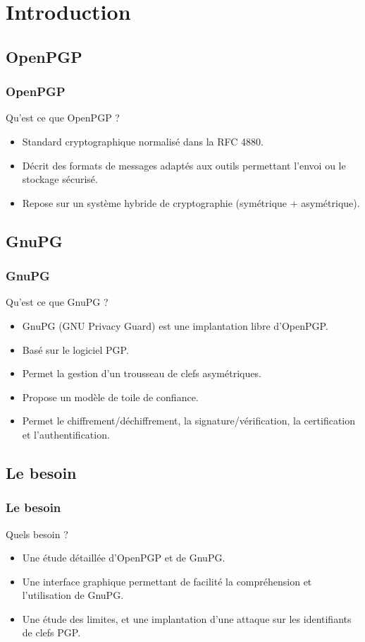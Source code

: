 \section{Introduction}
\subsection{OpenPGP}
\begin{frame}
    \frametitle{\color{white}OpenPGP}
    \begin{block}{Qu'est ce que OpenPGP ?}
    	\begin{itemize}
         \item Standard cryptographique normalisé dans la RFC 4880.
         \item Décrit des formats de messages adaptés aux outils permettant l’envoi ou le stockage sécurisé.
         \item Repose sur un système hybride de cryptographie (symétrique + asymétrique).
       \end{itemize} 
    \end{block}
\end{frame}

\subsection{GnuPG}
\begin{frame}
    \frametitle{\color{white}GnuPG}
    \begin{block}{Qu'est ce que GnuPG ?}
      \begin{itemize}
        \item GnuPG (GNU Privacy Guard) est une implantation libre d'OpenPGP.
        \item Basé sur le logiciel PGP.
        \item Permet la gestion d'un trousseau de clefs asymétriques.
        \item Propose un modèle de toile de confiance.
        \item Permet le chiffrement/déchiffrement, la signature/vérification, la certification et l'authentification.
      \end{itemize}
    \end{block}
\end{frame}

\subsection{Le besoin}
\begin{frame}
    \frametitle{\color{white}Le besoin}
    \begin{block}{Quels besoin ?}
    	\begin{itemize}
         \item Une étude détaillée d'OpenPGP et de GnuPG.
         \item Une interface graphique permettant de facilité la compréhension et l'utilisation de GnuPG.
         \item Une étude des limites, et une implantation d'une attaque sur les identifiants de clefs PGP.
       \end{itemize} 
    \end{block}
\end{frame}


